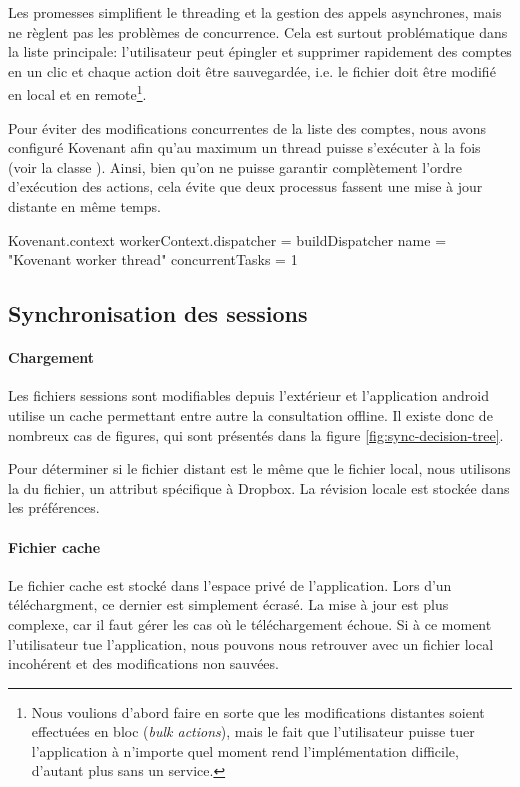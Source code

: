 Les promesses simplifient le threading et la gestion des appels asynchrones, mais ne règlent pas les problèmes de concurrence. Cela est surtout problématique dans la liste principale: l'utilisateur peut épingler et supprimer rapidement des comptes en un clic et chaque action doit être sauvegardée, i.e. le fichier doit être modifié en local et en remote\footnote{Nous voulions d'abord faire en sorte que les modifications distantes soient effectuées en bloc (\emph{bulk actions}), mais le fait que l'utilisateur puisse tuer l'application à n'importe quel moment rend l'implémentation difficile, d'autant plus sans un service.}.

Pour éviter des modifications concurrentes de la liste des comptes, nous avons configuré Kovenant afin qu'au maximum un thread puisse s'exécuter à la fois (voir la classe ). Ainsi, bien qu'on ne puisse garantir complètement l'ordre d'exécution des actions, cela évite que deux processus fassent une mise à jour distante en même temps.

\begin{kotlincode}
Kovenant.context {
    workerContext.dispatcher = buildDispatcher {
        name = "Kovenant worker thread"
        concurrentTasks = 1
    }
}
\end{kotlincode}    

\subsection{Synchronisation des sessions}

\paragraph*{Chargement} Les fichiers sessions sont modifiables depuis l'extérieur et l'application android utilise un cache permettant entre autre la consultation offline. Il existe donc de nombreux cas de figures, qui sont présentés dans la figure \ref{fig:sync-decision-tree}.


Pour déterminer si le fichier distant est le même que le fichier local, nous utilisons la  du fichier, un attribut spécifique à Dropbox. La révision locale est stockée dans les préférences.

\paragraph*{Fichier cache} Le fichier cache est stocké dans l'espace privé de l'application. Lors d'un téléchargment, ce dernier est simplement écrasé. La mise à jour est plus complexe, car il faut gérer les cas où le téléchargement échoue. Si à ce moment l'utilisateur tue l'application, nous pouvons nous retrouver avec un fichier local incohérent et des modifications non sauvées. 

